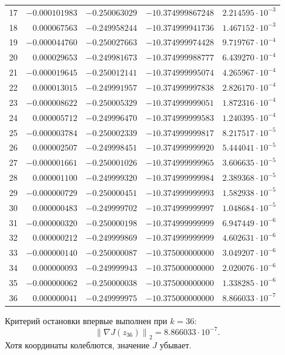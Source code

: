 \documentclass[12pt,a4paper]{article}
\newcommand{\norm}[1]{\left\lVert#1\right\rVert_2}
\begin{document}
\begin{center}
\begin{longtable}{r|r|r|r|r}
17 & $-0.000101983$ & $-0.250063029$ & $-10.374999867248$ & $2.214595\cdot10^{-3}$ \\
18 & $0.000067563$ & $-0.249958244$ & $-10.374999941736$ & $1.467152\cdot10^{-3}$ \\
19 & $-0.000044760$ & $-0.250027663$ & $-10.374999974428$ & $9.719767\cdot10^{-4}$ \\
20 & $0.000029653$ & $-0.249981673$ & $-10.374999988777$ & $6.439270\cdot10^{-4}$ \\
21 & $-0.000019645$ & $-0.250012141$ & $-10.374999995074$ & $4.265967\cdot10^{-4}$ \\
22 & $0.000013015$ & $-0.249991957$ & $-10.374999997838$ & $2.826170\cdot10^{-4}$ \\
23 & $-0.000008622$ & $-0.250005329$ & $-10.374999999051$ & $1.872316\cdot10^{-4}$ \\
24 & $0.000005712$ & $-0.249996470$ & $-10.374999999583$ & $1.240395\cdot10^{-4}$ \\
25 & $-0.000003784$ & $-0.250002339$ & $-10.374999999817$ & $8.217517\cdot10^{-5}$ \\
26 & $0.000002507$ & $-0.249998451$ & $-10.374999999920$ & $5.444041\cdot10^{-5}$ \\
27 & $-0.000001661$ & $-0.250001026$ & $-10.374999999965$ & $3.606635\cdot10^{-5}$ \\
28 & $0.000001100$ & $-0.249999320$ & $-10.374999999984$ & $2.389368\cdot10^{-5}$ \\
29 & $-0.000000729$ & $-0.250000451$ & $-10.374999999993$ & $1.582938\cdot10^{-5}$ \\
30 & $0.000000483$ & $-0.249999702$ & $-10.374999999997$ & $1.048684\cdot10^{-5}$ \\
31 & $-0.000000320$ & $-0.250000198$ & $-10.374999999999$ & $6.947449\cdot10^{-6}$ \\
32 & $0.000000212$ & $-0.249999869$ & $-10.374999999999$ & $4.602631\cdot10^{-6}$ \\
33 & $-0.000000140$ & $-0.250000087$ & $-10.375000000000$ & $3.049207\cdot10^{-6}$ \\
34 & $0.000000093$ & $-0.249999943$ & $-10.375000000000$ & $2.020076\cdot10^{-6}$ \\
35 & $-0.000000062$ & $-0.250000038$ & $-10.375000000000$ & $1.338285\cdot10^{-6}$ \\
36 & $0.000000041$ & $-0.249999975$ & $-10.375000000000$ & $8.866033\cdot10^{-7}$ \\
\hline\end{longtable}
\end{center}
Критерий остановки впервые выполнен при $k=36$:
\[
\norm{\nabla J(z_{36})}=8.866033\cdot10^{-7}.
\]
Хотя координаты колеблются, значение $J$ убывает.
\newpage
\end{document}
